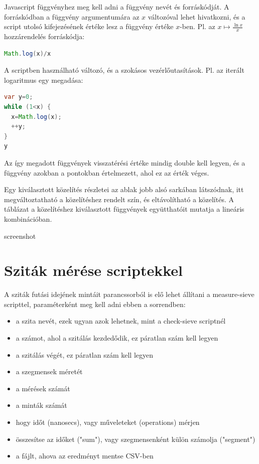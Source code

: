 \documentclass[12pt]{report}
\begin{document}
Javascript függvényhez meg kell adni a függvény nevét és forráskódját.
A forráskódban a függvény argumentumára az $x$ változóval lehet hivatkozni,
és a script utolsó kifejezésének értéke lesz a függvény
értéke $x$-ben. Pl. az $x \mapsto \frac{\ln{x}}{x}$ hozzárendelés
forráskódja:

{\small
\begin{lstlisting}[language=Java]
Math.log(x)/x
\end{lstlisting}
}

A scriptben használható változó, és a szokásos vezérlőutasítások.
Pl. az iterált logaritmus egy megadása:
{\small
\begin{lstlisting}[language=Java]
var y=0;
while (1<x) {
  x=Math.log(x);
  ++y;
}
y
\end{lstlisting}
}

Az így megadott függvények visszatérési értéke mindig double kell legyen,
és a függvény azokban a pontokban értelmezett, ahol ez az érték véges.

Egy kiválasztott közelítés részletei az ablak jobb alsó sarkában látszódnak,
itt megváltoztatható a közelítéshez rendelt szín, és eltávolítható a közelítés.
A táblázat a közelítéshez kiválasztott függvények együtthatóit mutatja
a lineáris kombinációban.

{\color{red}screenshot}

\section{Sziták mérése scriptekkel}

A sziták futási idejének mintáit parancssorból is elő lehet állítani
a measure-sieve scripttel, paraméterként meg kell adni ebben a sorrendben:

\begin{itemize}
\item a szita nevét, ezek ugyan azok lehetnek, mint a check-sieve scriptnél
\item a számot, ahol a szitálás kezdedődik, ez páratlan szám kell legyen
\item a szitálás végét, ez páratlan szám kell legyen
\item a szegmensek méretét
\item a mérések számát
\item a minták számát
\item hogy időt (nanosecs), vagy műveleteket (operations) mérjen
\item összesítse az időket ("sum"), vagy szegmensenként külön számolja ("segment")
\item a fájlt, ahova az eredményt mentse CSV-ben
\end{itemize}
\end{document}
